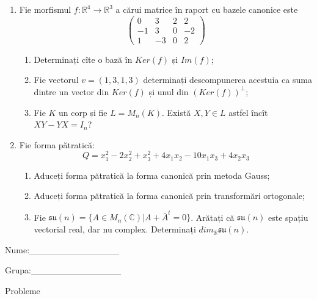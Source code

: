 \documentclass{article}
\begin{document}
\begin{enumerate}
 \item Fie morfismul $f:\mathbb{R}^4 \to \mathbb{R}^3$ a cărui matrice în raport cu bazele canonice este
$$\begin{pmatrix}
0&3&2&2\\
-1&3&0&-2\\
1&-3&0&2
\end{pmatrix}$$

\begin{enumerate}
\item Determinați cîte o bază în $Ker(f)$ și $Im(f)$;
\item Fie vectorul $v=(1,3,1,3)$ determinați descompunerea acestuia ca suma dintre un vector din $Ker(f)$ și unul din $(Ker(f))^\perp$;
\item Fie $K$ un corp și fie $L=M_n(K)$. Există $X,Y \in L$ astfel încît $XY-YX=I_n$?  
\end{enumerate}
\item Fie forma pătratică:
$$Q= x_1^2-2x_2^2+x_3^2+4x_1x_2-10x_1x_3+4x_2x_3$$

\begin{enumerate}
\item Aduceți forma pătratică la forma canonică prin metoda Gauss;
\item Aduceți forma pătratică la forma canonică prin transformări ortogonale;
\item Fie $\mathfrak{su}(n)=\{ A \in M_n(\mathbb{C}) | A+\bar{A}^t=0\}$. Arătați că $\mathfrak{su}(n)$ este spațiu vectorial real, dar nu complex.
Determinați $dim_{\mathbb{R}}\mathfrak{su}(n)$.
\end{enumerate}
\end{enumerate}
\newpage
\begin{flushright}
Nume:\_\_\_\_\_\_\_\_\_\_\_\_\_\_
 
 
Grupa:\_\_\_\_\_\_\_\_\_\_\_\_\_\_
\end{flushright}
\begin{center}
\vspace{2cm}
{\Large Probleme}
\vspace{2cm}
\end{center}
\end{document}
